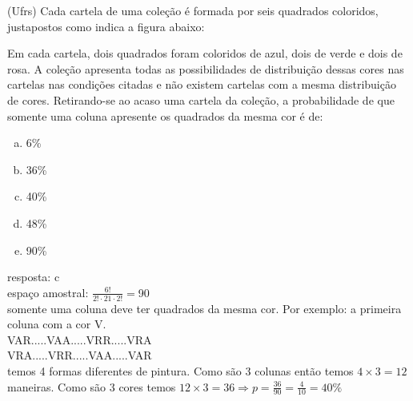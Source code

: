 \begin{ex}
(Ufrs) Cada cartela de uma coleção é formada por seis quadrados coloridos, justapostos como indica a figura abaixo:
   \begin{center}
   \end{center}
Em cada cartela, dois quadrados foram coloridos de azul, dois de verde e dois de rosa. A coleção apresenta todas as possibilidades de distribuição dessas cores nas cartelas nas condições citadas e não existem cartelas com a mesma distribuição de cores. Retirando-se ao acaso uma cartela da coleção, a probabilidade de que somente uma coluna apresente os quadrados da mesma cor é de:
   \begin{enumerate}[(a)]
   \item 6\%
   \item 36\%
   \item 40\%
   \item 48\%
   \item 90\%
   \end{enumerate}
    \begin{sol}
     resposta: c \\
     espaço amostral: $\frac{6!}{2!\cdot21\cdot2!}=$90 \\ somente uma  coluna deve ter  quadrados da mesma cor. 
     Por exemplo: a primeira coluna com a cor V. \\
     VAR.....VAA.....VRR.....VRA\\
     VRA.....VRR.....VAA.....VAR\\
     temos 4 formas diferentes de pintura. Como são 3 colunas então temos $4\times3=12$ maneiras. Como são 3 cores temos $12\times3=36 \Longrightarrow p=\frac{36}{90}=\frac{4}{10}=40\%$
    \end{sol}
\end{ex}